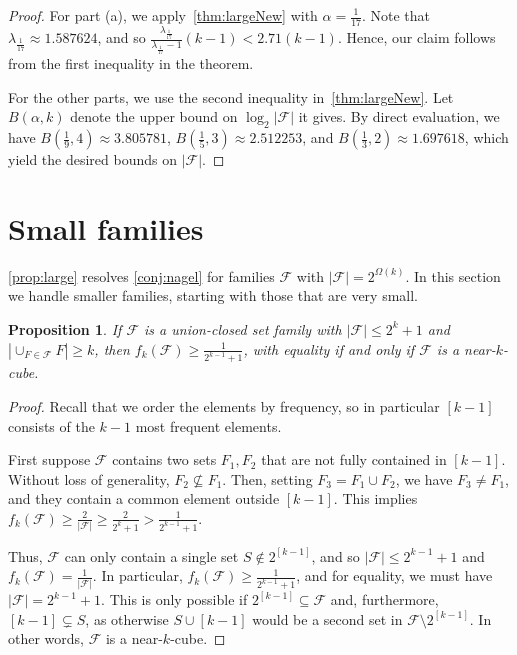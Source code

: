 \documentclass[a4paper,12pt]{article}
\theoremstyle{mystyle}	%
\newtheorem{proposition}[theorem]{Proposition}
\theoremstyle{definition}
\newcommand{\F}{\mathcal{F}}
\newcommand{\6}{\partial}
\begin{document}
\begin{proof}
    For part (a), we apply~\cref{thm:largeNew} with $\alpha = \frac{1}{17}$. Note that $\lambda_{\frac1{17}}\approx 1.587624$, and so $\frac{\lambda_{\frac1{17}}}{\lambda_{\frac1{17}}-1}(k-1)< 2.71(k-1)$. Hence, our claim follows from the first inequality in the theorem.
    
    For the other parts, we use the second inequality in~\cref{thm:largeNew}. Let $B(\alpha,k)$ denote the upper bound on $\log_2 |\F|$ it gives. By direct evaluation, we have $B(\frac19,4) \approx 3.805781$, $B(\frac15,3) \approx 2.512253$, and $B(\frac13, 2) \approx 1.697618$, which yield the desired bounds on $|\F|$.
\end{proof} 

\section{Small families} \label{sec:small}

\cref{prop:large} resolves \cref{conj:nagel} for families $\F$ with $|\F| = 2^{\Omega(k)}$. In this section we handle smaller families, starting with those that are very small.

\begin{proposition} \label{prop:small}
    If $\F$ is a union-closed set family with $|\F| \le 2^k + 1$ and $|\cup_{F \in \F} F| \ge k$, then $f_k(\F) \ge \frac{1}{2^{k-1} + 1}$, with equality if and only if $\F$ is a near-$k$-cube.
\end{proposition}

\begin{proof}
    Recall that we order the elements by frequency, so in particular $[k-1]$ consists of the $k-1$ most frequent elements.
    
    First suppose $\mathcal{F}$ contains two sets $F_1, F_2$ that are not fully contained in $[k-1]$. Without loss of generality, $F_2 \not\subseteq F_1$. Then, setting $F_3 = F_1 \cup F_2$, we have $F_3 \neq F_1$, and they contain a common element outside $[k-1]$. This implies $f_k(\F) \ge \frac{2}{|\F|} \ge \frac{2}{2^k + 1} > \frac{1}{2^{k-1} + 1}$.

    Thus, $\F$ can only contain a single set $S \notin 2^{[k-1]}$, and so $|\F| \le 2^{k-1} + 1$ and $f_k(\F) = \frac{1}{|\F|}$. In particular, $f_k(\F) \ge \frac{1}{2^{k-1} + 1}$, and for equality, we must have $|\F| = 2^{k-1} + 1$. This is only possible if $2^{[k-1]} \subseteq \F$ and, furthermore, $[k-1] \subsetneq S$, as otherwise $S \cup [k-1]$ would be a second set in $\F \setminus 2^{[k-1]}$. In other words, $\F$ is a near-$k$-cube.
\end{proof}
\end{document}
